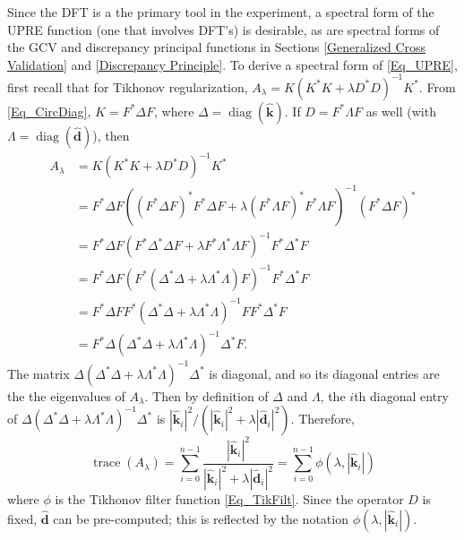 \documentclass[12pt]{article}
\newcommand{\kdis}{\mathbf{k}}
\newcommand{\kmat}{K}	%
\newcommand{\ddis}{\mathbf{d}}	%
\newcommand{\ctrans}{*}	%
\newcommand{\trace}{\operatorname{trace}}	%
\newcommand{\diag}{\operatorname{diag}}
\newcommand{\regparam}{\lambda}
\newcommand{\filt}{\phi}
\newcommand{\A}{A_{\regparam}}	%
\begin{document}
Since the DFT is a the primary tool in the experiment, a spectral form of the UPRE function (one that involves DFT's) is desirable, as are spectral forms of the GCV and discrepancy principal functions in Sections \ref{Generalized Cross Validation} and \ref{Discrepancy Principle}. To derive a spectral form of \eqref{Eq_UPRE}, first recall that for Tikhonov regularization, $\A = \kmat(\kmat^\ctrans\kmat + \regparam{D^\ctrans}D)^{-1}\kmat^\ctrans$. From \eqref{Eq_CircDiag}, $\kmat = F^*\Delta{F}$, where $\Delta = \diag(\widehat{\kdis})$. If $D = F^\ctrans\Lambda{F}$ as well (with $\Lambda = \diag(\widehat{\ddis})$), then
\begin{align*}
\A &= \kmat(\kmat^\ctrans\kmat + \regparam{D^\ctrans}D)^{-1}\kmat^\ctrans \\
&= F^*\Delta{F}((F^*\Delta{F})^\ctrans F^\ctrans\Delta{F} + \regparam(F^\ctrans\Lambda{F})^\ctrans F^\ctrans\Lambda{F})^{-1}(F^*\Delta{F})^\ctrans \\
&= F^\ctrans\Delta{F}(F^\ctrans\Delta^\ctrans\Delta{F} + \regparam{F^\ctrans\Lambda^\ctrans\Lambda{F}})^{-1}F^\ctrans\Delta^\ctrans{F} \\
&= F^\ctrans\Delta{F}(F^\ctrans(\Delta^\ctrans\Delta + \regparam\Lambda^\ctrans\Lambda)F)^{-1}F^\ctrans\Delta^\ctrans{F} \\
&= F^\ctrans\Delta{F}F^\ctrans(\Delta^\ctrans\Delta + \regparam\Lambda^\ctrans\Lambda)^{-1}FF^\ctrans\Delta^\ctrans{F} \\
&= F^\ctrans\Delta(\Delta^\ctrans\Delta + \regparam\Lambda^\ctrans\Lambda)^{-1}\Delta^\ctrans{F}.
\end{align*}
The matrix $\Delta(\Delta^\ctrans\Delta + \regparam\Lambda^\ctrans\Lambda)^{-1}\Delta^\ctrans$ is diagonal, and so its diagonal entries are the the eigenvalues of $\A$. Then by definition of $\Delta$ and $\Lambda$, the $i$th diagonal entry of $\Delta(\Delta^\ctrans\Delta + \regparam\Lambda^\ctrans\Lambda)^{-1}\Delta^\ctrans$ is $|\widehat{\kdis}_i|^2/(|\widehat{\kdis}_i|^2 + \regparam|\widehat{\ddis}_i|^2)$. Therefore,
\begin{equation}
\trace(\A) = \sum_{i = 0}^{n-1} \frac{|\widehat{\kdis}_i|^2}{|\widehat{\kdis}_i|^2 + \regparam|\widehat{\ddis}_i|^2} = \sum_{i = 0}^{n-1} \filt(\regparam,|\widehat{\kdis}_i|)
\label{Eq_TraceUPRE}
\end{equation}
where $\filt$ is the Tikhonov filter function \eqref{Eq_TikFilt}. Since the operator $D$ is fixed, $\widehat{\ddis}$ can be pre-computed; this is reflected by the notation $\filt(\regparam,|\widehat{\kdis}_i|)$. \par
\end{document}
